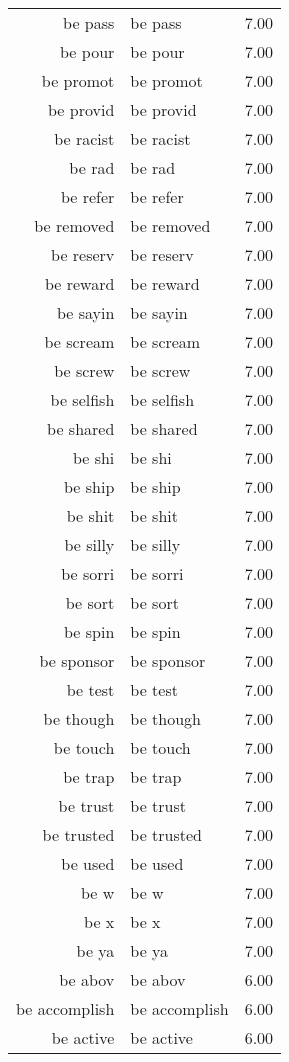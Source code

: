 \begin{table}[ht]
\begin{tabular}{rlr}
  be pass & be pass & 7.00 \\ 
  be pour & be pour & 7.00 \\ 
  be promot & be promot & 7.00 \\ 
  be provid & be provid & 7.00 \\ 
  be racist & be racist & 7.00 \\ 
  be rad & be rad & 7.00 \\ 
  be refer & be refer & 7.00 \\ 
  be removed & be removed & 7.00 \\ 
  be reserv & be reserv & 7.00 \\ 
  be reward & be reward & 7.00 \\ 
  be sayin & be sayin & 7.00 \\ 
  be scream & be scream & 7.00 \\ 
  be screw & be screw & 7.00 \\ 
  be selfish & be selfish & 7.00 \\ 
  be shared & be shared & 7.00 \\ 
  be shi & be shi & 7.00 \\ 
  be ship & be ship & 7.00 \\ 
  be shit & be shit & 7.00 \\ 
  be silly & be silly & 7.00 \\ 
  be sorri & be sorri & 7.00 \\ 
  be sort & be sort & 7.00 \\ 
  be spin & be spin & 7.00 \\ 
  be sponsor & be sponsor & 7.00 \\ 
  be test & be test & 7.00 \\ 
  be though & be though & 7.00 \\ 
  be touch & be touch & 7.00 \\ 
  be trap & be trap & 7.00 \\ 
  be trust & be trust & 7.00 \\ 
  be trusted & be trusted & 7.00 \\ 
  be used & be used & 7.00 \\ 
  be w & be w & 7.00 \\ 
  be x & be x & 7.00 \\ 
  be ya & be ya & 7.00 \\ 
  be abov & be abov & 6.00 \\ 
  be accomplish & be accomplish & 6.00 \\ 
  be active & be active & 6.00 \\ 

\end{tabular}
\end{table}
